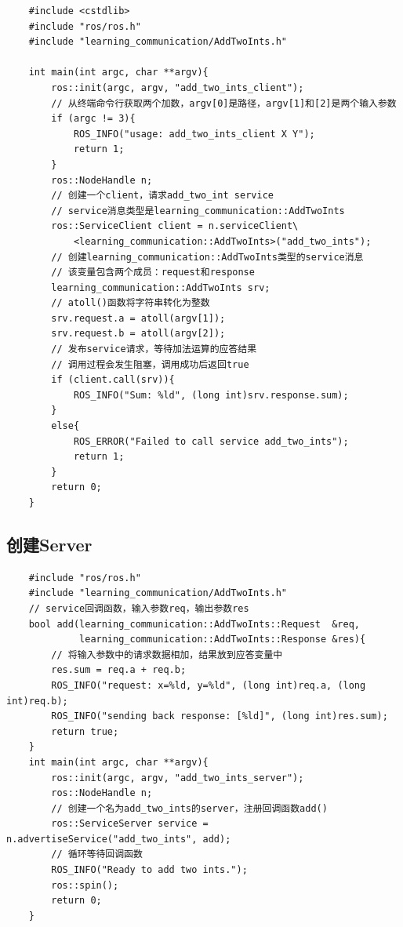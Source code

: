 \documentclass[9pt, oneside]{book}
\begin{document}
\begin{verbatim}
    #include <cstdlib>
    #include "ros/ros.h"
    #include "learning_communication/AddTwoInts.h"
    
    int main(int argc, char **argv){
        ros::init(argc, argv, "add_two_ints_client");
        // 从终端命令行获取两个加数，argv[0]是路径，argv[1]和[2]是两个输入参数
        if (argc != 3){
            ROS_INFO("usage: add_two_ints_client X Y");
            return 1;
        }
        ros::NodeHandle n;    
        // 创建一个client，请求add_two_int service
        // service消息类型是learning_communication::AddTwoInts
        ros::ServiceClient client = n.serviceClient\
            <learning_communication::AddTwoInts>("add_two_ints");
        // 创建learning_communication::AddTwoInts类型的service消息
        // 该变量包含两个成员：request和response
        learning_communication::AddTwoInts srv;
        // atoll()函数将字符串转化为整数
        srv.request.a = atoll(argv[1]);
        srv.request.b = atoll(argv[2]);
        // 发布service请求，等待加法运算的应答结果
        // 调用过程会发生阻塞，调用成功后返回true
        if (client.call(srv)){
            ROS_INFO("Sum: %ld", (long int)srv.response.sum);
        }
        else{
            ROS_ERROR("Failed to call service add_two_ints");
            return 1;
        }
        return 0;
    }
\end{verbatim}

\subsection{创建Server}

\begin{verbatim}
    #include "ros/ros.h"
    #include "learning_communication/AddTwoInts.h"
    // service回调函数，输入参数req，输出参数res
    bool add(learning_communication::AddTwoInts::Request  &req,
             learning_communication::AddTwoInts::Response &res){
        // 将输入参数中的请求数据相加，结果放到应答变量中
        res.sum = req.a + req.b;
        ROS_INFO("request: x=%ld, y=%ld", (long int)req.a, (long int)req.b);
        ROS_INFO("sending back response: [%ld]", (long int)res.sum);
        return true;
    }
    int main(int argc, char **argv){
        ros::init(argc, argv, "add_two_ints_server");
        ros::NodeHandle n;
        // 创建一个名为add_two_ints的server，注册回调函数add()
        ros::ServiceServer service = n.advertiseService("add_two_ints", add);
        // 循环等待回调函数
        ROS_INFO("Ready to add two ints.");
        ros::spin();
        return 0;
    }    
\end{verbatim}
\end{document}
